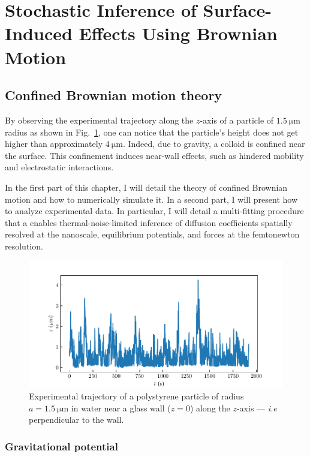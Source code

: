 \section{Stochastic Inference of Surface-Induced Effects Using Brownian Motion}

\subsection{Confined Brownian motion theory}

By observing the experimental trajectory along the $z$-axis of a particle of $1.5 ~ \mathrm{\mu m} $ radius as shown in Fig.~\ref{Fig:exp_z_traj}, one can notice that the particle's height does not get higher than approximately $4 ~ \mathrm{\mu m}$. Indeed, due to gravity, a colloid is confined near the surface. This confinement induces near-wall effects, such as hindered mobility and electrostatic interactions. 

In the first part of this chapter, I will detail the theory of confined Brownian motion and how to numerically simulate it. In a second part, I will present how to analyze experimental data. In particular, I will detail a multi-fitting procedure that a enables thermal-noise-limited inference of diffusion coefficients spatially resolved at the nanoscale, equilibrium potentials, and forces at the femtonewton resolution.

\begin{figure}[ht]
	\centering
	\includegraphics{02_body/chapter3/images/traj_z/traj_z.pdf}
	\caption{Experimental trajectory of a polystyrene particle of radius $a = 1.5 ~ \mathrm{\mu m}$ in water near a glass wall ($z = 0$) along the $z$-axis --- \textit{i.e} perpendicular to the wall.}
	\label{Fig:exp_z_traj}
\end{figure}

\subsubsection{Gravitational potential}


